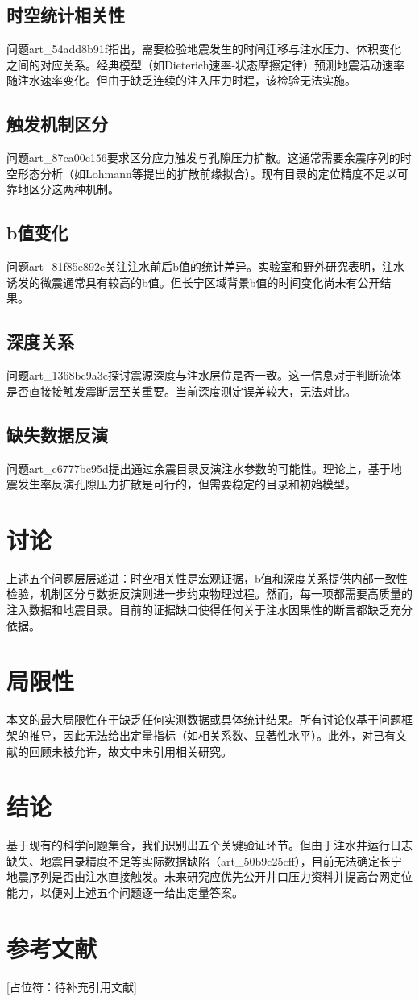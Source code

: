 \documentclass{ctexart}
\begin{document}
\subsection{时空统计相关性}
问题art\_54add8b91f指出，需要检验地震发生的时间迁移与注水压力、体积变化之间的对应关系。经典模型（如Dieterich速率-状态摩擦定律）预测地震活动速率随注水速率变化。但由于缺乏连续的注入压力时程，该检验无法实施。

\subsection{触发机制区分}
问题art\_87ca00c156要求区分应力触发与孔隙压力扩散。这通常需要余震序列的时空形态分析（如Lohmann等提出的扩散前缘拟合）。现有目录的定位精度不足以可靠地区分这两种机制。

\subsection{b值变化}
问题art\_81f85e892e关注注水前后b值的统计差异。实验室和野外研究表明，注水诱发的微震通常具有较高的b值。但长宁区域背景b值的时间变化尚未有公开结果。

\subsection{深度关系}
问题art\_1368bc9a3c探讨震源深度与注水层位是否一致。这一信息对于判断流体是否直接接触发震断层至关重要。当前深度测定误差较大，无法对比。

\subsection{缺失数据反演}
问题art\_c6777bc95d提出通过余震目录反演注水参数的可能性。理论上，基于地震发生率反演孔隙压力扩散是可行的，但需要稳定的目录和初始模型。

\section{讨论}
上述五个问题层层递进：时空相关性是宏观证据，b值和深度关系提供内部一致性检验，机制区分与数据反演则进一步约束物理过程。然而，每一项都需要高质量的注入数据和地震目录。目前的证据缺口使得任何关于注水因果性的断言都缺乏充分依据。

\section{局限性}
本文的最大局限性在于缺乏任何实测数据或具体统计结果。所有讨论仅基于问题框架的推导，因此无法给出定量指标（如相关系数、显著性水平）。此外，对已有文献的回顾未被允许，故文中未引用相关研究。

\section{结论}
基于现有的科学问题集合，我们识别出五个关键验证环节。但由于注水井运行日志缺失、地震目录精度不足等实际数据缺陷（art\_50b9c25cff），目前无法确定长宁地震序列是否由注水直接触发。未来研究应优先公开井口压力资料并提高台网定位能力，以便对上述五个问题逐一给出定量答案。

\section*{参考文献}
[占位符：待补充引用文献]




\end{document}
